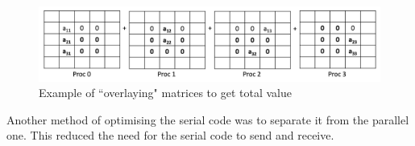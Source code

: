 \documentclass[11pt]{article}
\begin{document}
	\begin{figure}[htb]
		\centering
		\includegraphics[width=\linewidth]{vorticity.jpg} 
	   	\caption{Example of ``overlaying" matrices to get total value}
	   	\label{fig:overlaying_example}
	\end{figure}
	
		Another method of optimising the serial code was to separate it from the parallel one. This reduced the need for the serial code to send and receive.
	
\end{document}
